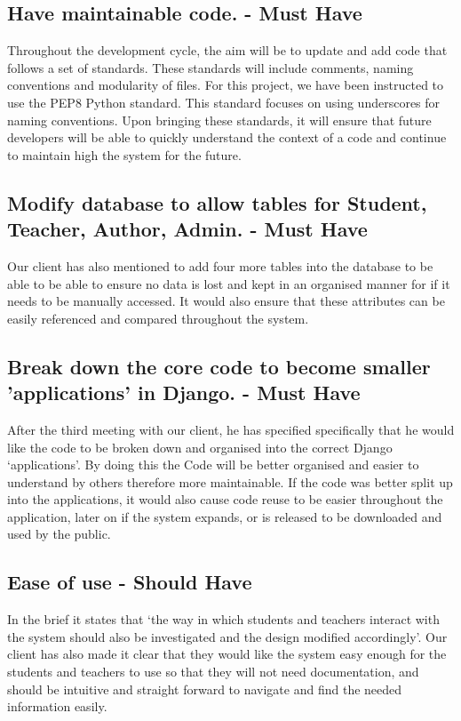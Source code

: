 \documentclass[12pt]{article}
\begin{document}
    	\subsection{Have maintainable code. - Must Have}
	Throughout the development cycle, the aim will be to update and add code that follows a set of standards. These standards will include comments, naming conventions and modularity of files. For this project, we have been instructed to use the PEP8 Python standard. This standard focuses on using underscores for naming conventions. Upon bringing these standards, it will ensure that future developers will be able to quickly understand the context of a code and continue to maintain high the system for the future.
	
	\subsection{Modify database to allow tables for Student, Teacher, Author, Admin. - Must Have}
	Our client has also mentioned to add four more tables into the database to be able to be able to ensure no data is lost and kept in an organised manner for if it needs to be manually accessed. It would also ensure that these attributes can be easily referenced and compared throughout the system.
	
	\subsection{Break down the core code to become smaller 'applications' in Django. - Must Have}
	After the third meeting with our client, he has specified specifically that he would like the code to be broken down and organised into the correct Django ‘applications’. By doing this the Code will be better organised and easier to understand by others therefore more maintainable. If the code was better split up into the applications, it would also cause code reuse to be easier throughout the application, later on if the system expands, or is released to be downloaded and used by the public.
	\subsection{Ease of use - Should Have}
	In the brief it states that ‘the way in which students and teachers interact with the system should also be investigated and the design modified accordingly’. Our client has also made it clear that they would like the system easy enough for the students and teachers to use so that they will not need documentation, and should be intuitive and straight forward to navigate and find the needed information easily.
\end{document}

